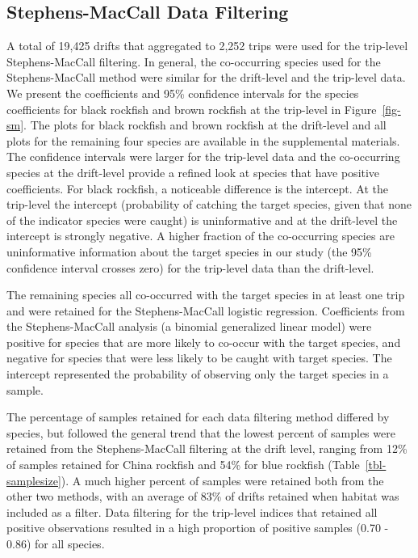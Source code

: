 \documentclass[
  12pt,
  authoryear,
  preprint,
  3p]{elsarticle}
\begin{document}
\hypertarget{stephens-maccall-data-filtering-1}{%
\subsection{Stephens-MacCall Data
Filtering}\label{stephens-maccall-data-filtering-1}}

A total of 19,425 drifts that aggregated to 2,252 trips were used for
the trip-level Stephens-MacCall filtering. In general, the co-occurring
species used for the Stephens-MacCall method were similar for the
drift-level and the trip-level data. We present the coefficients and
95\% confidence intervals for the species coefficients for black
rockfish and brown rockfish at the trip-level in Figure~\ref{fig-sm}.
The plots for black rockfish and brown rockfish at the drift-level and
all plots for the remaining four species are available in the
supplemental materials. The confidence intervals were larger for the
trip-level data and the co-occurring species at the drift-level provide
a refined look at species that have positive coefficients. For black
rockfish, a noticeable difference is the intercept. At the trip-level
the intercept (probability of catching the target species, given that
none of the indicator species were caught) is uninformative and at the
drift-level the intercept is strongly negative. A higher fraction of the
co-occurring species are uninformative information about the target
species in our study (the 95\% confidence interval crosses zero) for the
trip-level data than the drift-level.

The remaining species all co-occurred with the target species in at
least one trip and were retained for the Stephens-MacCall logistic
regression. Coefficients from the Stephens-MacCall analysis (a binomial
generalized linear model) were positive for species that are more likely
to co-occur with the target species, and negative for species that were
less likely to be caught with target species. The intercept represented
the probability of observing only the target species in a sample.

The percentage of samples retained for each data filtering method
differed by species, but followed the general trend that the lowest
percent of samples were retained from the Stephens-MacCall filtering at
the drift level, ranging from 12\% of samples retained for China
rockfish and 54\% for blue rockfish (Table~\ref{tbl-samplesize}). A much
higher percent of samples were retained both from the other two methods,
with an average of 83\% of drifts retained when habitat was included as
a filter. Data filtering for the trip-level indices that retained all
positive observations resulted in a high proportion of positive samples
(0.70 - 0.86) for all species.
\end{document}
